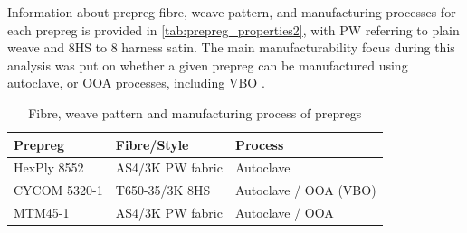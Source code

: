 

Information about prepreg fibre, weave pattern, and manufacturing processes for each prepreg is provided in \autoref{tab:prepreg_properties2}, with PW referring to plain weave and 8HS to 8 harness satin. The main manufacturability focus during this analysis was put on whether a given prepreg can be manufactured using autoclave, or OOA processes, including VBO \cite{CENTEA2015132}.

\begin{table}[H]
    \centering
    \caption{Fibre, weave pattern and manufacturing process of prepregs   }
    \label{tab:prepreg_properties2}
    \begin{tabular}{|p{3cm}|p{4cm}|p{3cm}|}
        \hline
        \textbf{Prepreg} & \textbf{Fibre/Style} & \textbf{Process} \\\hline\hline
        HexPly 8552 & AS4/3K PW fabric & Autoclave \\ \hline
        CYCOM 5320-1  & T650-35/3K 8HS & Autoclave / OOA (VBO) \\\hline
        MTM45-1  & AS4/3K PW fabric & Autoclave / OOA \\
        \hline
    \end{tabular}
\end{table}

